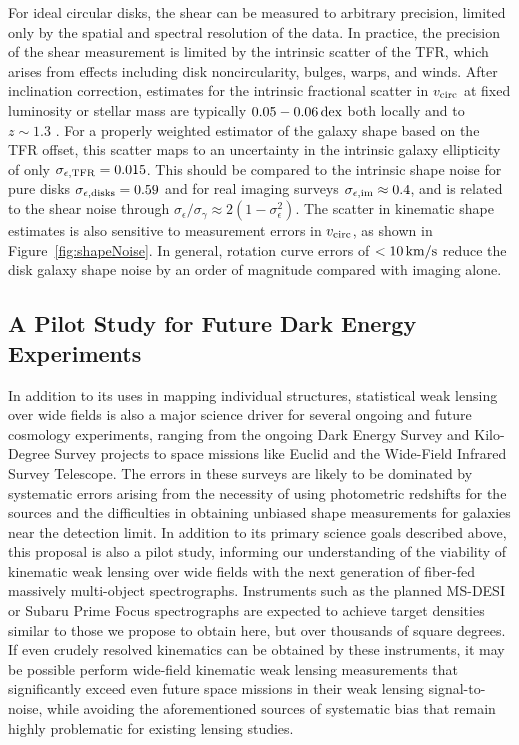 \documentclass[12pt]{article}
\begin{document}
For ideal circular disks, the shear can be measured to arbitrary precision, limited only by the spatial and spectral resolution of the data. In practice, the precision of the shear measurement is limited by the intrinsic scatter of the TFR, which arises from effects including disk noncircularity, bulges, warps, and winds. After inclination correction, estimates for the intrinsic fractional scatter in $v_{\rm circ}$ at fixed luminosity or stellar mass are typically $0.05-0.06\,{\rm dex}$ both locally and to $z\sim1.3$ \citep{Reyes2011, Miller2011}. For a properly weighted estimator of the galaxy shape based on the TFR offset, this scatter maps to an uncertainty in the intrinsic galaxy ellipticity of only $\sigma_{\epsilon, {\rm TFR}}=0.015$. This should be compared to the intrinsic shape noise for pure disks $\sigma_{\epsilon, {\rm disks}}=0.59$ and for real imaging surveys $\sigma_{\epsilon, {\rm im}}\approx0.4$, and is related to the shear noise through $\sigma_\epsilon / \sigma_\gamma \approx 2(1-\sigma_\epsilon^2)$\citep{Bernstein2002, Hirata2004}. The scatter in kinematic shape estimates is also sensitive to measurement errors in $v_{\rm circ}$, as shown in Figure~\ref{fig:shapeNoise}. In general, rotation curve errors of $<10\,{\rm km/s}$ reduce the disk galaxy shape noise by an order of magnitude compared with imaging alone.

\subsection{A Pilot Study for Future Dark Energy Experiments}

In addition to its uses in mapping individual structures, statistical weak lensing over wide fields is also a major science driver for several ongoing and future cosmology experiments, ranging from the ongoing Dark Energy Survey and Kilo-Degree Survey projects to space missions like Euclid and the Wide-Field Infrared Survey Telescope. The errors in these surveys are likely to be dominated by systematic errors arising from the necessity of using photometric redshifts for the sources and the difficulties in obtaining unbiased shape measurements for galaxies near the detection limit. In addition to its primary science goals described above, this proposal is also a pilot study, informing our understanding of the viability of kinematic weak lensing over wide fields with the next generation of fiber-fed massively multi-object spectrographs. Instruments such as the planned MS-DESI or Subaru Prime Focus spectrographs are expected to achieve target densities similar to those we propose to obtain here, but over thousands of square degrees. If even crudely resolved kinematics can be obtained by these instruments, it may be possible perform wide-field kinematic weak lensing measurements that significantly exceed even future space missions in their weak lensing signal-to-noise, while avoiding the aforementioned sources of systematic bias that remain highly problematic for existing lensing studies.
\end{document}
